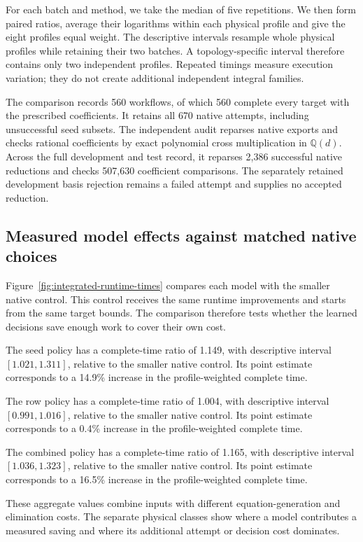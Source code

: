 For each batch and method, we take the median of five repetitions.
We then form paired ratios, average their logarithms within each physical
profile and give the eight profiles equal weight. The descriptive intervals
resample whole physical profiles while retaining their two batches.
A topology-specific interval therefore contains only two independent profiles.
Repeated timings measure execution variation; they do not create additional
independent integral families.

The comparison records 560 workflows, of which 560 complete every target with the prescribed coefficients. It retains all 670 native attempts, including unsuccessful seed subsets. The independent audit reparses native exports and checks rational coefficients by exact polynomial cross multiplication in $\mathbb Q(d)$. Across the full development and test record, it reparses 2,386 successful native reductions and checks 507,630 coefficient comparisons. The separately retained development basis rejection remains a failed attempt and supplies no accepted reduction.

\subsection{Measured model effects against matched native choices}
Figure~\ref{fig:integrated-runtime-times} compares each model with the smaller
native control. This control receives the same runtime improvements and
starts from the same target bounds. The comparison therefore tests whether
the learned decisions save enough work to cover their own cost.

The seed policy has a complete-time ratio of 1.149, with descriptive interval $[1.021,1.311]$, relative to the smaller native control. Its point estimate corresponds to a 14.9\% increase in the profile-weighted complete time.

The row policy has a complete-time ratio of 1.004, with descriptive interval $[0.991,1.016]$, relative to the smaller native control. Its point estimate corresponds to a 0.4\% increase in the profile-weighted complete time.

The combined policy has a complete-time ratio of 1.165, with descriptive interval $[1.036,1.323]$, relative to the smaller native control. Its point estimate corresponds to a 16.5\% increase in the profile-weighted complete time.

These aggregate values combine inputs with different equation-generation and
elimination costs. The separate physical classes show where a model contributes
a measured saving and where its additional attempt or decision cost dominates.

